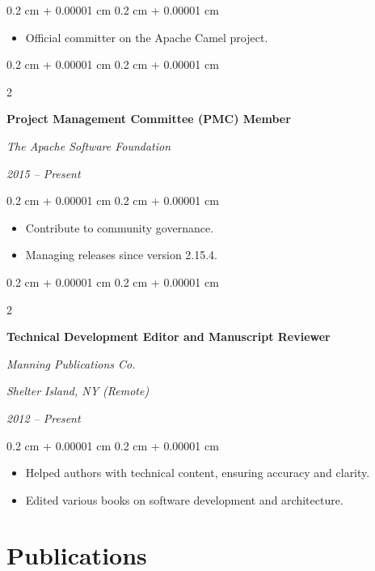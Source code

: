 \documentclass[10pt, letterpaper]{article}
\newenvironment{highlights}{
    \begin{itemize}[
        topsep=0.10 cm,
        parsep=0.10 cm,
        partopsep=0pt,
        itemsep=0pt,
        leftmargin=0.4 cm + 10pt
    ]
}{
    \end{itemize}
} %
\newenvironment{onecolentry}{
    \begin{adjustwidth}{
        0.2 cm + 0.00001 cm
    }{
        0.2 cm + 0.00001 cm
    }
}{
    \end{adjustwidth}
} %
\newenvironment{twocolentry}[2][]{
    \onecolentry
    \def\secondColumn{#2}
    \setcolumnwidth{\fill, 6 cm}
    \begin{paracol}{2}
}{
    \switchcolumn \raggedleft \secondColumn
    \end{paracol}
    \endonecolentry
} %
\begin{document}
\vspace{0.10 cm}
\begin{onecolentry}
    \begin{highlights}
        \item Official committer on the Apache Camel project.
    \end{highlights}
\end{onecolentry}

\vspace{0.20 cm}

\begin{twocolentry}{
        \textit{2015 – Present}}
    \textbf{Project Management Committee (PMC) Member}

    \textit{The Apache Software Foundation}
\end{twocolentry}

\vspace{0.10 cm}
\begin{onecolentry}
    \begin{highlights}
        \item Contribute to community governance.
        \item Managing releases since version 2.15.4.
    \end{highlights}
\end{onecolentry}

\vspace{0.20 cm}

\begin{twocolentry}{
        \textit{Shelter Island, NY (Remote)}

        \textit{2012 – Present}}
    \textbf{Technical Development Editor and Manuscript Reviewer}

    \textit{Manning Publications Co.}
\end{twocolentry}

\vspace{0.10 cm}
\begin{onecolentry}
    \begin{highlights}
        \item Helped authors with technical content, ensuring accuracy and clarity.
        \item Edited various books on software development and architecture.
    \end{highlights}
\end{onecolentry}
\section{Publications}
\end{document}
